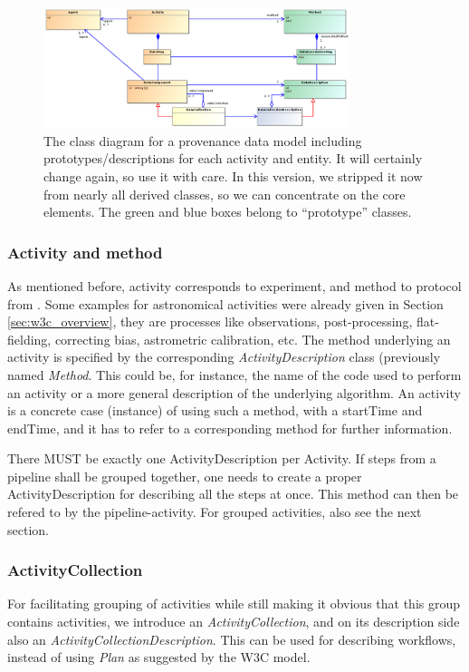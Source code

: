 \documentclass[11pt,a4paper]{ivoa}
\begin{document}
\begin{figure}
\centering
\includegraphics[width=0.8\textwidth]{ProvDM-classdiagram-prototypes.png}
\caption{The class diagram for a provenance data model including prototypes/descriptions for each activity and entity. It will certainly change again, so use it with care. In this version, we stripped it now from nearly all derived classes, so we can concentrate on the core elements. The green and blue boxes belong to ``prototype'' classes.}
\label{fig:classes-prototypes}
\end{figure}


\subsubsection{Activity and method}
As mentioned before, activity corresponds to experiment, and method to protocol from \cite{std:SimDM}.
Some examples for astronomical activities were already given in Section \ref{sec:w3c_overview}, they are processes like observations, post-processing, flat-fielding, correcting bias, astrometric calibration, etc. The method underlying an activity is specified by the corresponding \emph{ActivityDescription} class (previously named \emph{Method}. This could be, for instance, the name of the code used to perform an activity or a more general description of the underlying algorithm. An activity is a concrete case (instance) of using such a method, with a startTime and endTime, and it has to refer to a corresponding method for further information. 

There MUST be exactly one ActivityDescription per Activity. If steps from a pipeline shall be 
grouped together, one needs to create a proper ActivityDescription for describing all 
the steps at once. This method can then be refered to by the pipeline-activity. For grouped activities, also see the next section.

\subsubsection{ActivityCollection}
For facilitating grouping of activities while still making it obvious that this group contains activities, we introduce an \emph{ActivityCollection}, and on its description side also an \emph{ActivityCollectionDescription}. This can be used for describing workflows, instead of using \emph{Plan} as suggested by the W3C model.
\end{document}
